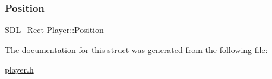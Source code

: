 \mbox{\label{structPlayer_a790577b95757d4f7b27442264fdee116}} 
\subsubsection{\texorpdfstring{Position}{Position}}
{\footnotesize\ttfamily S\+D\+L\+\_\+\+Rect Player\+::\+Position}



The documentation for this struct was generated from the following file\+:\begin{DoxyCompactItemize}
\item 
\hyperlink{player_8h}{player.\+h}\end{DoxyCompactItemize}
